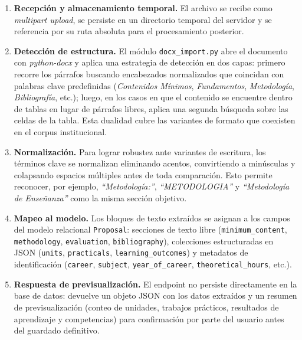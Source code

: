 \begin{enumerate}[noitemsep, topsep=3pt]
    \item \textbf{Recepci\'{o}n y almacenamiento temporal.} El archivo se
          recibe como \textit{multipart upload}, se persiste en un directorio
          temporal del servidor y se referencia por su ruta absoluta para el
          procesamiento posterior.

    \item \textbf{Detecci\'{o}n de estructura.} El m\'{o}dulo
          \texttt{docx\_import.py} abre el documento con \textit{python-docx}
          y aplica una estrategia de detecci\'{o}n en dos capas: primero
          recorre los p\'{a}rrafos buscando encabezados normalizados que
          coincidan con palabras clave predefinidas
          (\textit{Contenidos M\'{i}nimos}, \textit{Fundamentos},
          \textit{Metodolog\'{i}a}, \textit{Bibliograf\'{i}a}, etc.); luego,
          en los casos en que el contenido se encuentre dentro de tablas en
          lugar de p\'{a}rrafos libres, aplica una segunda b\'{u}squeda sobre
          las celdas de la tabla. Esta dualidad cubre las variantes de formato
          que coexisten en el corpus institucional.

    \item \textbf{Normalizaci\'{o}n.} Para lograr robustez ante variantes
          de escritura, los t\'{e}rminos clave se normalizan eliminando
          acentos, convirtiendo a min\'{u}sculas y colapsando espacios
          m\'{u}ltiples antes de toda comparaci\'{o}n. Esto permite reconocer,
          por ejemplo, \textit{``Metodolog\'{i}a:''}, \textit{``METODOLOGIA''}
          y \textit{``Metodolog\'{i}a de Ense\~{n}anza''} como la misma
          secci\'{o}n objetivo.

    \item \textbf{Mapeo al modelo.} Los bloques de texto extra\'{i}dos se
          asignan a los campos del modelo relacional \texttt{Proposal}:
          secciones de texto libre (\texttt{minimum\_content},
          \texttt{methodology}, \texttt{evaluation}, \texttt{bibliography}),
          colecciones estructuradas en JSON (\texttt{units},
          \texttt{practicals}, \texttt{learning\_outcomes}) y metadatos de
          identificaci\'{o}n (\texttt{career}, \texttt{subject},
          \texttt{year\_of\_career}, \texttt{theoretical\_hours}, etc.).

    \item \textbf{Respuesta de previsualizaci\'{o}n.} El endpoint no persiste
          directamente en la base de datos: devuelve un objeto JSON con los
          datos extra\'{i}dos y un resumen de previsualizaci\'{o}n (conteo de
          unidades, trabajos pr\'{a}cticos, resultados de aprendizaje y
          competencias) para confirmaci\'{o}n por parte del usuario antes del
          guardado definitivo.
\end{enumerate}

